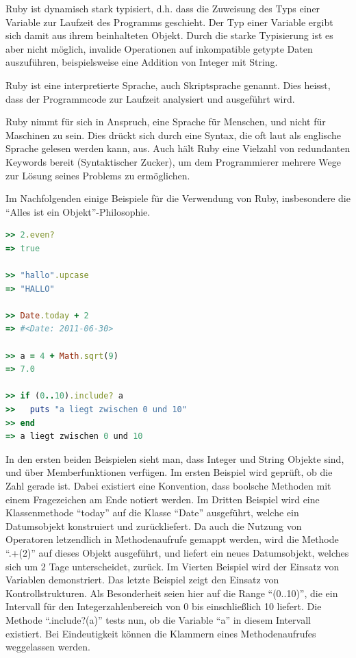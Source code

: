 Ruby ist dynamisch stark typisiert, d.h. dass die Zuweisung des Typs einer Variable zur Laufzeit des Programms geschieht. Der Typ einer Variable ergibt sich damit aus ihrem beinhalteten Objekt. Durch die starke Typisierung ist es aber nicht möglich, invalide Operationen auf inkompatible getypte Daten auszuführen, beispielsweise eine Addition von Integer mit String.

Ruby ist eine interpretierte Sprache, auch Skriptsprache genannt. Dies heisst, dass der Programmcode zur Laufzeit analysiert und ausgeführt wird. 

Ruby nimmt für sich in Anspruch, eine Sprache für Menschen, und nicht für Maschinen zu sein. Dies drückt sich durch eine Syntax, die oft laut als englische Sprache gelesen werden kann, aus. Auch hält Ruby eine Vielzahl von redundanten Keywords bereit (Syntaktischer Zucker), um dem Programmierer mehrere Wege zur Lösung seines Problems zu ermöglichen.

\setlength{\epigraphwidth}{\marginparwidth}
\setlength{\epigraphwidth}{0.8\textwidth}

Im Nachfolgenden einige Beispiele für die Verwendung von Ruby, insbesondere die "`Alles ist ein Objekt"'-Philosophie.

\begin{lstlisting}[language=Ruby,label=Ruby Beispiele,caption=Ruby Beispiele]
>> 2.even?
=> true

>> "hallo".upcase
=> "HALLO"

>> Date.today + 2
=> #<Date: 2011-06-30>

>> a = 4 + Math.sqrt(9)
=> 7.0

>> if (0..10).include? a
>>   puts "a liegt zwischen 0 und 10"
>> end
=> a liegt zwischen 0 und 10

\end{lstlisting}
In den ersten beiden Beispielen sieht man, dass Integer und String Objekte sind, und über Memberfunktionen verfügen. Im ersten Beispiel wird geprüft, ob die Zahl gerade ist. Dabei existiert eine Konvention, dass boolsche Methoden mit einem Fragezeichen am Ende notiert werden. Im Dritten Beispiel wird eine Klassenmethode "`today"' auf die Klasse "`Date"' ausgeführt, welche ein Datumsobjekt konstruiert und zurückliefert. Da auch die Nutzung von Operatoren letzendlich in Methodenaufrufe gemappt werden, wird die Methode "`.+(2)"' auf dieses Objekt ausgeführt, und liefert ein neues Datumsobjekt, welches sich um 2 Tage unterscheidet, zurück.
Im Vierten Beispiel wird der Einsatz von Variablen demonstriert. 
Das letzte Beispiel zeigt den Einsatz von Kontrollstrukturen. Als Besonderheit seien hier auf die Range "`(0..10)"', die ein Intervall für den Integerzahlenbereich von 0 bis einschließlich 10 liefert. Die Methode "`.include?(a)"' tests nun, ob die Variable "`a"' in diesem Intervall existiert. Bei Eindeutigkeit können die Klammern eines Methodenaufrufes weggelassen werden.

